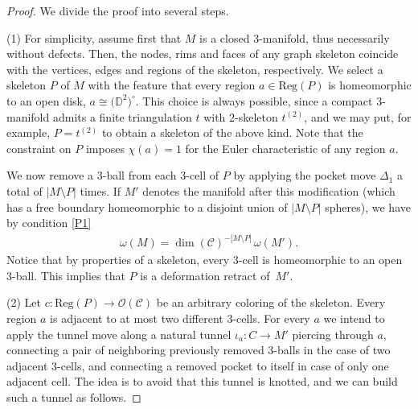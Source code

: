 \documentclass[10pt,a4paper]{amsart}
\numberwithin{equation}{section}
\theoremstyle{definition}
\begin{document}
\begin{proof}
 We divide the proof into several steps.

 (1) For simplicity, assume first that $M$ is a closed 3-manifold, thus necessarily without defects. Then, the nodes, rims and faces of any graph skeleton coincide with the vertices, edges and regions of the skeleton, respectively. We select a skeleton $P$ of $M$ with the feature that every region $a \in \mathrm{Reg}(P)$ is homeomorphic to an open disk, $a \cong \bigl(\mathbb{D}^2\bigr)^{\circ}$. This choice is always possible, since a compact 3-manifold admits a finite triangulation $t$ with 2-skeleton $t^{(2)}$, and we may put, for example, $P = t^{(2)}$ to obtain a skeleton of the above kind. Note that the constraint on $P$ imposes $\chi(a) = 1$ for the Euler characteristic of any region $a$.

 We now remove a 3-ball from each 3-cell of $P$ by applying the pocket move $\Delta_1$ a total of $|M\setminus P|$ times. If $M'$ denotes the manifold after this modification (which has a free boundary homeomorphic to a disjoint union of $|M\setminus P|$ spheres), we have by condition \ref{P1}
 \begin{align}
 \label{eqT1}
 \omega(M) = \dim(\mathcal{C})^{-|M\setminus P|} \, \omega(M').
 \end{align}
 Notice that by properties of a skeleton, every 3-cell is homeomorphic to an open 3-ball. This implies that $P$ is a deformation retract of~$M'$.

 (2) Let $c\colon \mathrm{Reg}(P) \rightarrow \mathcal{O}({\mathcal{C}})$ be an arbitrary coloring of the skeleton. Every region $a$ is adjacent to at most two different 3-cells. For every $a$ we intend to apply the tunnel move  along a natural tunnel $\iota_a\colon C \rightarrow M'$ piercing through $a$, connecting a pair of neighboring previously removed 3-balls in the case of two adjacent 3-cells, and connecting a removed pocket to itself in case of only one adjacent cell. The idea is to avoid that this tunnel is knotted, and we can build such a tunnel as follows.


\end{proof}
\end{document}
